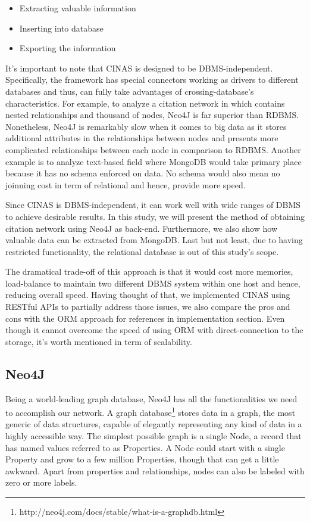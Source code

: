 \documentclass{sig-alternate}
\begin{document}
{\begin{itemize}
\item Extracting valuable information
\item Inserting into database
\item Exporting the information
\end{itemize}

It's important to note that CINAS is designed to be DBMS-independent. Specifically, the framework has special connectors working as drivers to different databases and thus, can fully take advantages of crossing-database's characteristics. For example, to analyze a citation network in which contains nested relationships and thousand of nodes,  Neo4J is far superior than RDBMS. Nonetheless, Neo4J is remarkably slow when it comes to big data as it stores additional attributes in the relationships between nodes and presents more complicated relationships between each node in comparison to RDBMS. Another example is to analyze text-based field where MongoDB would take primary place because it has no schema enforced on data. No schema would also mean no joinning cost in term of relational and hence, provide more speed. 

Since CINAS is DBMS-independent, it can work well with wide ranges of DBMS to achieve desirable results. In this study, we will present the method of obtaining citation network using Neo4J as back-end. Furthermore, we also show how valuable data can be extracted from MongoDB. Last but not least, due to having restricted functionality, the relational database is out of this study's scope.

The dramatical trade-off of this approach is that it would cost more memories, load-balance to maintain two different DBMS system within one host and hence, reducing overall speed. Having thought of that, we implemented CINAS using RESTful APIs to partially address those issues, we also compare the pros and cons with the ORM approach for references in implementation section. Even though it cannot overcome the speed of using ORM with direct-connection to the storage, it's worth mentioned in term of scalability.
\subsection{Neo4J}
Being a world-leading graph database, Neo4J has all the functionalities we need to accomplish our network. A graph database\footnote{http://neo4j.com/docs/stable/what-is-a-graphdb.html} stores data in a graph, the most generic of data structures, capable of elegantly representing any kind of data in a highly accessible way. The simplest possible graph is a single Node, a record that has named values referred to as Properties. A Node could start with a single Property and grow to a few million Properties, though that can get a little awkward. Apart from properties and relationships, nodes can also be labeled with zero or more labels.

}
\end{document}
